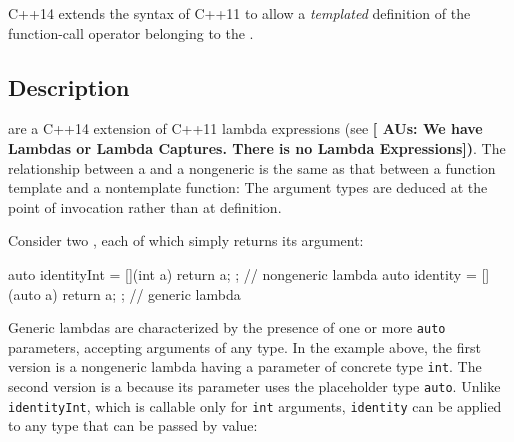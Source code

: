 

\label{generic-lambdas}
\setcounter{table}{0}
\setcounter{footnote}{0}
\setcounter{lstlisting}{0}



C++14 extends the  syntax of C++11 to allow a
\emph{templated} definition of the function-call operator belonging to
the .

\subsection[Description]{Description}\label{description}

 are a C++14 extension of C++11 lambda
expressions (see \featureref{}{}\textbf{[ AUs: We have Lambdas or Lambda Captures. There is no Lambda Expressions])}. The relationship
between a  and a nongeneric  is the same as that between a function template and a
nontemplate function: The argument types are deduced at the point of
invocation rather than at definition.

Consider two , each of which simply returns
its argument:

\begin{emcppslisting}
auto identityInt = [](int  a) { return a; };  // nongeneric lambda
auto identity =    [](auto a) { return a; };  // generic lambda
\end{emcppslisting}
    

\noindent Generic lambdas are characterized by the presence of one or more
\lstinline!auto! parameters, accepting arguments of any type. In the
example above, the first version is a nongeneric lambda having a
parameter of concrete type \lstinline!int!. The second version is a
 because its parameter uses the placeholder type
\lstinline!auto!. Unlike \lstinline!identityInt!, which is callable only for
\lstinline!int! arguments, \lstinline!identity! can be applied to any type
that can be passed by value:

